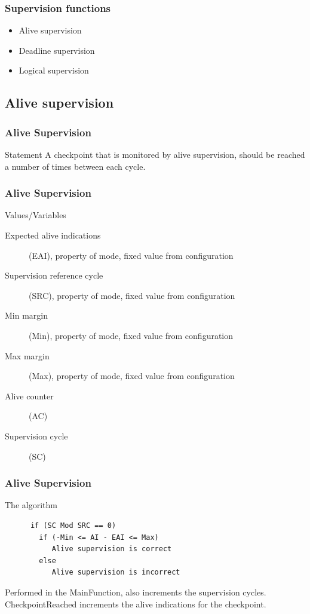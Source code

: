 \documentclass{beamer}
\begin{document}
\begin{frame}
  \frametitle{Supervision functions}
  \begin{itemize}
    \item Alive supervision
    \item Deadline supervision
    \item Logical supervision
  \end{itemize}
\end{frame}

\subsection{Alive supervision}
\begin{frame}
  \frametitle{Alive Supervision}
  \begin{block}{Statement}
    A checkpoint that is monitored by alive supervision, should be
    reached a number of times between each cycle.
  \end{block}
\end{frame}

\begin{frame}
  \frametitle{Alive Supervision}
  \begin{block}{Values/Variables}
    \begin{description}
      \item[Expected alive indications] (EAI), property of mode, fixed
        value from configuration
      \item[Supervision reference cycle] (SRC), property of mode, fixed value
        from configuration
      \item[Min margin] (Min), property of mode, fixed value from configuration
      \item[Max margin] (Max), property of mode, fixed value from configuration
      \item[Alive counter] (AC)
      \item[Supervision cycle] (SC)
    \end{description}
  \end{block}
\end{frame}

\begin{frame}[fragile]
  \frametitle{Alive Supervision}
  \begin{block}{The algorithm}
    \begin{lstlisting}
      if (SC Mod SRC == 0)
        if (-Min <= AI - EAI <= Max)
           Alive supervision is correct
        else
           Alive supervision is incorrect
    \end{lstlisting}
  \end{block}
  Performed in the MainFunction, also increments the supervision
  cycles.\\
  CheckpointReached increments the alive indications for the
  checkpoint.
\end{frame}
\end{document}

